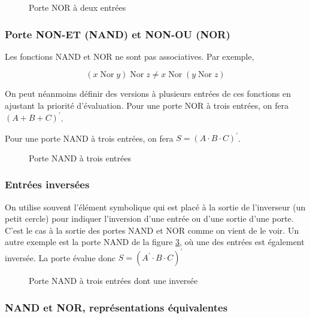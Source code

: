 \documentclass[11pt]{article}
\begin{document}
\begin{figure}[htbp]
\centering

\caption{\label{fig:org906127d}Porte NOR à deux entrées}
\end{figure}

\subsubsection{Porte NON-ET (NAND) et NON-OU (NOR)}
\label{sec:org093661e}

Les fonctions NAND et NOR ne sont pas associatives. Par exemple,

$$
(x \operatorname{Nor} y) \operatorname{Nor} z \neq x \operatorname{Nor} (y \operatorname{Nor} z) 
$$

On peut néanmoins définir des versions à plusieurs entrées de ces
fonctions en ajustant la priorité d'évaluation. Pour une porte NOR à
trois entrées, on fera \((A + B + C)^\prime\).

Pour une porte NAND à trois entrées, on fera \(S = (A \cdot B \cdot
C)^\prime\).

\begin{figure}[htbp]
\centering

\caption{\label{fig:orge601450}Porte NAND à trois entrées}
\end{figure}

\subsubsection{Entrées inversées}
\label{sec:org3500e0e}

On utilise souvent l'élément symbolique qui est placé à la sortie de
l'inverseur (un petit cercle) pour indiquer l'inversion d'une entrée
ou d'une sortie d'une porte. C'est le cas à la sortie des portes NAND
et NOR comme on vient de le voir. Un autre exemple est la porte NAND
de la figure \ref{fig:orga6c7926}, où une des entrées est également
inversée. La porte évalue donc \(S =  (A^\prime \cdot B  \cdot C)^\prime\)

\begin{figure}[htbp]
\centering

\caption{\label{fig:orga6c7926}Porte NAND à trois entrées dont une inversée}
\end{figure} 

\subsubsection{NAND et NOR, représentations équivalentes}
\label{sec:orgf31e31f}
\end{document}
